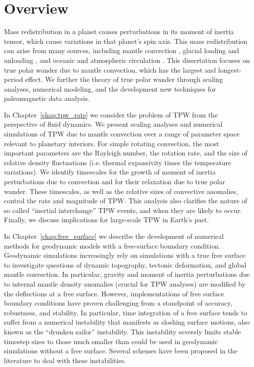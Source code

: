 \section{Overview}

Mass redistribution in a planet causes perturbations in its moment of inertia tensor,
which cause variations in that planet's spin axis. This mass redistribution can
arise from many sources, including mantle convection \citep{spada1992excitation}, 
glacial loading and unloading \citep{chen2013rapid}, and oceanic and atmospheric circulation \citep{munk1960rotation}.
This dissertation focuses on true polar wander due to mantle convection, which has the largest and longest-period effect.
We further the theory of true polar wander through scaling analyses,
numerical modeling, and the development new techniques for paleomagnetic data analysis.

In Chapter~\ref{chap:tpw_rate} we consider the problem of TPW from the perspective of fluid dynamics.
We present scaling analyses and numerical simulations of TPW due to mantle convection over a range of parameter space relevant to planetary interiors. 
For simple rotating convection, the most important parameters are the Rayleigh number, the rotation rate, and the size of relative density fluctuations 
(i.e. thermal expansivity times the temperature variations). 
We identify timescales for the growth of moment of inertia perturbations due to convection and for their relaxation due to true polar wander. 
These timescales, as well as the relative sizes of convective anomalies, control the rate and magnitude of TPW.
This analysis also clarifies the nature of so called ``inertial interchange'' TPW events, and when they are likely to occur.
Finally, we discuss implications for large-scale TPW in Earth's past.

In Chapter~\ref{chap:free_surface} we describe the development of numerical methods
for geodynamic models with a free-surface boundary condition.
Geodynamic simulations increasingly rely on simulations with a true free surface to 
investigate questions of dynamic topography, tectonic deformation, and
global mantle convection. In particular, gravity and moment of inertia perturbations
due to internal mantle density anomalies (crucial for TPW analyses) are modified by the deflections at a free surface.
However, implementations of free surface boundary conditions 
have proven challenging from a standpoint of accuracy, robustness, and stability.
In particular, time integration of a free surface tends to suffer from a numerical instability
that manifests as sloshing surface motions, also known as the ``drunken sailor'' instability.
This instability severely limits stable timestep sizes to those much smaller than could be used
in geodynamic simulations without a free surface. 
Several schemes have been proposed in the literature to deal with these instabilities.


